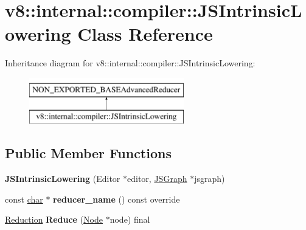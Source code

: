 \hypertarget{classv8_1_1internal_1_1compiler_1_1JSIntrinsicLowering}{}\section{v8\+:\+:internal\+:\+:compiler\+:\+:J\+S\+Intrinsic\+Lowering Class Reference}
\label{classv8_1_1internal_1_1compiler_1_1JSIntrinsicLowering}
Inheritance diagram for v8\+:\+:internal\+:\+:compiler\+:\+:J\+S\+Intrinsic\+Lowering\+:\begin{figure}[H]
\begin{center}
\leavevmode
\includegraphics[height=2.000000cm]{classv8_1_1internal_1_1compiler_1_1JSIntrinsicLowering}
\end{center}
\end{figure}
\subsection*{Public Member Functions}
\begin{DoxyCompactItemize}
\item 
\mbox{\label{classv8_1_1internal_1_1compiler_1_1JSIntrinsicLowering_af9d793206353959f66862d21c7d17d8e}} 
{\bfseries J\+S\+Intrinsic\+Lowering} (Editor $\ast$editor, \mbox{\hyperlink{classv8_1_1internal_1_1compiler_1_1JSGraph}{J\+S\+Graph}} $\ast$jsgraph)
\item 
\mbox{\label{classv8_1_1internal_1_1compiler_1_1JSIntrinsicLowering_a0eefb88ee31dc6389c593423256eeb06}} 
const \mbox{\hyperlink{classchar}{char}} $\ast$ {\bfseries reducer\+\_\+name} () const override
\item 
\mbox{\label{classv8_1_1internal_1_1compiler_1_1JSIntrinsicLowering_a5efff03e40c4dc32ae92ee22b553305f}} 
\mbox{\hyperlink{classv8_1_1internal_1_1compiler_1_1Reduction}{Reduction}} {\bfseries Reduce} (\mbox{\hyperlink{classv8_1_1internal_1_1compiler_1_1Node}{Node}} $\ast$node) final
\end{DoxyCompactItemize}


